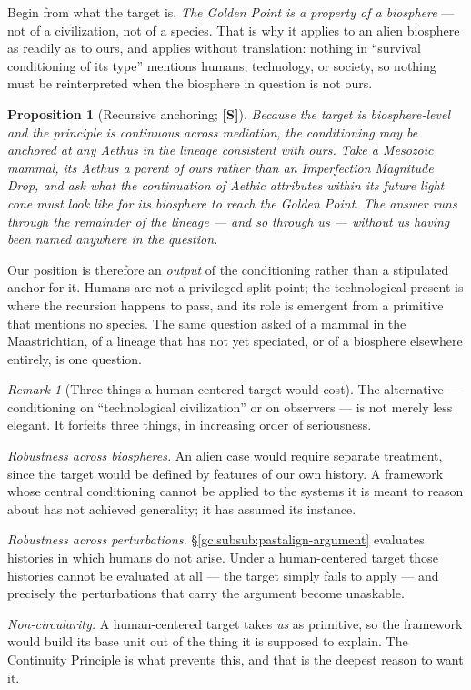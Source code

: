 \documentclass[11pt]{article}
\numberwithin{equation}{section}
\theoremstyle{plain}
\newtheorem{proposition}[theorem]{Proposition}
\theoremstyle{definition}
\theoremstyle{remark}
\newtheorem{remark}[theorem]{Remark}
\begin{document}
Begin from what the target is. \emph{The Golden Point is a property of a
biosphere} --- not of a civilization, not of a species. That is why it
applies to an alien biosphere as readily as to ours, and applies without
translation: nothing in ``survival conditioning of its type'' mentions
humans, technology, or society, so nothing must be reinterpreted when
the biosphere in question is not ours.

\begin{proposition}[Recursive anchoring; \textbf{[S]}]
\label{gc:prop:recursive}
Because the target is biosphere-level and the principle is continuous
across mediation, the conditioning may be anchored at \emph{any} Aethus
in the lineage consistent with ours. Take a Mesozoic mammal, its Aethus
a parent of ours rather than an Imperfection Magnitude Drop, and ask
what the continuation of Aethic attributes within \emph{its} future
light cone must look like for its biosphere to reach the Golden Point.
The answer runs through the remainder of the lineage --- and so through
us --- without us having been named anywhere in the question.
\end{proposition}

\noindent Our position is therefore an \emph{output} of the conditioning
rather than a stipulated anchor for it. Humans are not a privileged
split point; the technological present is where the recursion happens to
pass, and its role is emergent from a primitive that mentions no
species. The same question asked of a mammal in the Maastrichtian, of a
lineage that has not yet speciated, or of a biosphere elsewhere entirely,
is one question.

\begin{remark}[Three things a human-centered target would cost]
\label{gc:rem:privilegecost}
The alternative --- conditioning on ``technological civilization'' or on
observers --- is not merely less elegant. It forfeits three things, in
increasing order of seriousness.

\emph{Robustness across biospheres.} An alien case would require
separate treatment, since the target would be defined by features of our
own history. A framework whose central conditioning cannot be applied to
the systems it is meant to reason about has not achieved generality; it
has assumed its instance.

\emph{Robustness across perturbations.} \S\ref{gc:subsub:pastalign-argument}
evaluates histories in which humans do not arise. Under a human-centered
target those histories cannot be evaluated at all --- the target simply
fails to apply --- and precisely the perturbations that carry the
argument become unaskable.

\emph{Non-circularity.} A human-centered target takes \emph{us} as
primitive, so the framework would build its base unit out of the thing
it is supposed to explain. The Continuity Principle is what prevents
this, and that is the deepest reason to want it.
\end{remark}
\end{document}
